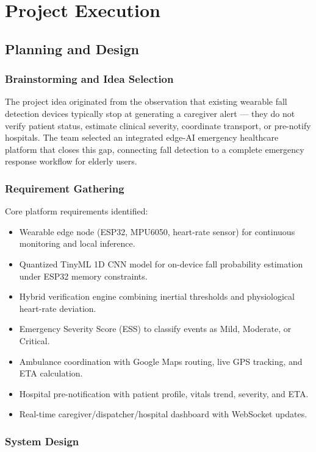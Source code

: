 \chapter{Project Execution}

\section[Planning and Design]{\textbf{Planning and Design}}

\subsection{Brainstorming and Idea Selection}

The project idea originated from the observation that existing wearable fall detection devices typically stop at generating a caregiver alert — they do not verify patient status, estimate clinical severity, coordinate transport, or pre-notify hospitals. The team selected an integrated edge-AI emergency healthcare platform that closes this gap, connecting fall detection to a complete emergency response workflow for elderly users.

\subsection{Requirement Gathering}

Core platform requirements identified:
\begin{itemize}
\item Wearable edge node (ESP32, MPU6050, heart-rate sensor) for continuous monitoring and local inference.
\item Quantized TinyML 1D CNN model for on-device fall probability estimation under ESP32 memory constraints.
\item Hybrid verification engine combining inertial thresholds and physiological heart-rate deviation.
\item Emergency Severity Score (ESS) to classify events as Mild, Moderate, or Critical.
\item Ambulance coordination with Google Maps routing, live GPS tracking, and ETA calculation.
\item Hospital pre-notification with patient profile, vitals trend, severity, and ETA.
\item Real-time caregiver/dispatcher/hospital dashboard with WebSocket updates.
\end{itemize}

\subsection{System Design}

